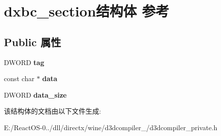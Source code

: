 \hypertarget{structdxbc__section}{}\section{dxbc\+\_\+section结构体 参考}
\label{structdxbc__section}
\subsection*{Public 属性}
\begin{DoxyCompactItemize}
\item 
\mbox{\label{structdxbc__section_a091fa8b6de722660b1a98e963ef1c8b8}} 
D\+W\+O\+RD {\bfseries tag}
\item 
\mbox{\label{structdxbc__section_a9da255fdffc962561383280e4ad08adc}} 
const char $\ast$ {\bfseries data}
\item 
\mbox{\label{structdxbc__section_a4cb3f0cd42aebea816cbb2ca34766e94}} 
D\+W\+O\+RD {\bfseries data\+\_\+size}
\end{DoxyCompactItemize}


该结构体的文档由以下文件生成\+:\begin{DoxyCompactItemize}
\item 
E\+:/\+React\+O\+S-\/0../dll/directx/wine/d3dcompiler\+\_/d3dcompiler\+\_\+private.\+h\end{DoxyCompactItemize}
